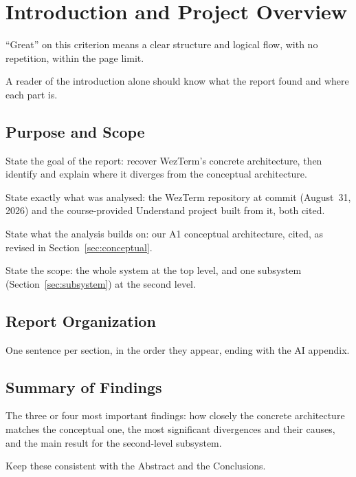\section{Introduction and Project Overview}
\label{sec:introduction}


\begin{requirements}
  \item ``Great'' on this criterion means a clear structure and logical flow, with no repetition, within the page limit.
  \item A reader of the introduction alone should know what the report found and where each part is.
\end{requirements}

\subsection{Purpose and Scope}
\label{sec:purpose}

\begin{requirements}
  \item State the goal of the report: recover WezTerm's concrete architecture, then identify and explain where it diverges from the conceptual architecture.
  \item State exactly what was analysed: the WezTerm repository at commit \pinnedcommit{} (August~31, 2026) and the course-provided Understand project built from it, both cited.
  \item State what the analysis builds on: our A1 conceptual architecture, cited, as revised in Section~\ref{sec:conceptual}.
  \item State the scope: the whole system at the top level, and one subsystem (Section~\ref{sec:subsystem}) at the second level.
\end{requirements}

\subsection{Report Organization}
\label{sec:organization}

\begin{requirements}
  \item One sentence per section, in the order they appear, ending with the AI appendix.
\end{requirements}

\subsection{Summary of Findings}
\label{sec:summary-findings}

\begin{requirements}
  \item The three or four most important findings: how closely the concrete architecture matches the conceptual one, the most significant divergences and their causes, and the main result for the second-level subsystem.
  \item Keep these consistent with the Abstract and the Conclusions.
\end{requirements}
